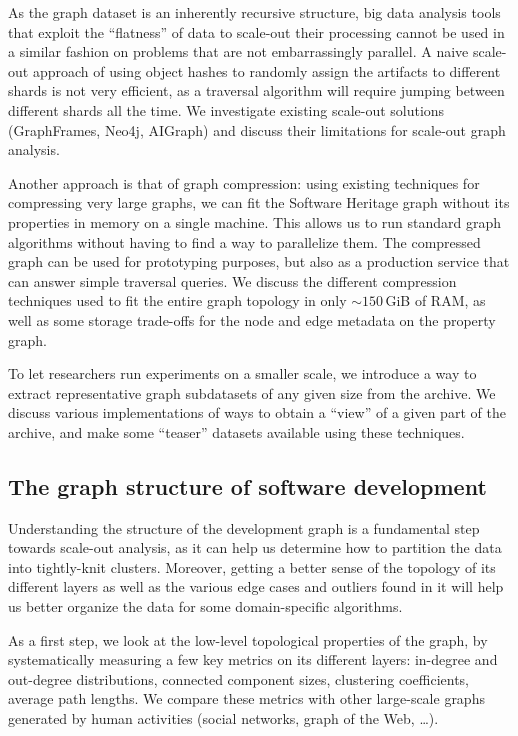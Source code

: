 As the graph dataset is an inherently recursive structure, big data analysis
tools that exploit the ``flatness'' of data to scale-out their processing cannot
be used in a similar fashion on problems that are not embarrassingly parallel.
A naive scale-out approach of using object hashes to randomly assign the
artifacts to different shards is not very efficient, as a traversal algorithm
will require jumping between different shards all the time. We investigate
existing scale-out solutions (GraphFrames, Neo4j, AIGraph) and discuss their
limitations for scale-out graph analysis.

Another approach is that of graph compression: using existing techniques for
compressing very large graphs, we can fit the Software Heritage graph without
its properties in memory on a single machine. This allows us to run standard
graph algorithms without having to find a way to parallelize them. The
compressed graph can be used for prototyping purposes, but also as a production
service that can answer simple traversal queries. We discuss the different
compression techniques used to fit the entire graph topology in only
$\sim150$\,GiB of RAM, as well as some storage trade-offs for the node and
edge metadata on the property graph.

To let researchers run experiments on a smaller scale, we introduce a way to
extract representative graph subdatasets of any given size from the archive. We
discuss various implementations of ways to obtain a ``view'' of a given part of
the archive, and make some ``teaser'' datasets available using these techniques.

\subsection*{The graph structure of software development}

Understanding the structure of the development graph is a fundamental step
towards scale-out analysis, as it can help us determine how to partition the
data into tightly-knit clusters. Moreover, getting a better sense of the
topology of its different layers as well as the various edge cases and outliers
found in it will help us better organize the data for some domain-specific
algorithms.

As a first step, we look at the low-level topological properties of the graph,
by systematically measuring a few key metrics on its different layers:
in-degree and out-degree distributions, connected component sizes, clustering
coefficients, average path lengths. We compare these metrics with other
large-scale graphs generated by human activities (social networks, graph of the
Web, …).


